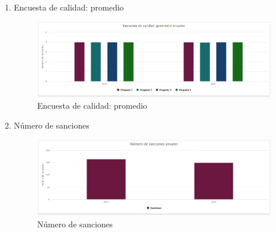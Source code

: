 \begin{itemize}
\begin{enumerate}
	\item Encuesta de calidad: promedio
	\begin{figure}[hbtp]
	\includegraphics[scale=0.7]{images/Interfaz/IUGS15_encuestaCalidadAnos.PNG}
	\caption{Encuesta de calidad: promedio}
	\end{figure}
	
	\item Número de sanciones 
	\begin{figure}[hbtp]
	\includegraphics[scale=0.7]{images/Interfaz/IUGS15_sancionesAnos.PNG}
	\caption{Número de sanciones}
	\end{figure}
	
	\end{enumerate}
	
\end{itemize}